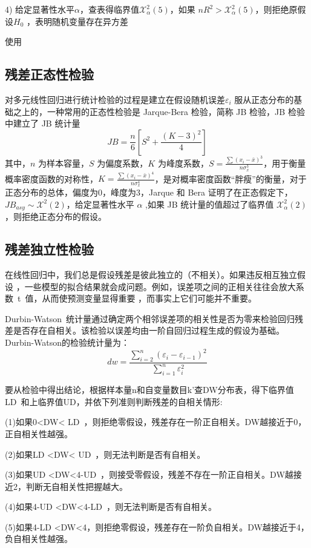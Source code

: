 \documentclass [a4paper]{article}
\begin{document}
4) 给定显著性水平$\alpha$，查表得临界值$\mathcal{X}_\alpha^2(5)$，如果 $nR^2>\mathcal{X}_\alpha^2(5)$，则拒绝原假设$H_0$ ，表明随机变量存在异方差

使用
\subsection{残差正态性检验}


对多元线性回归进行统计检验的过程是建立在假设随机误差$\varepsilon_i$ 服从正态分布的基础之上的，一种常用的正态性检验是 Jarque-Bera 检验，简称 JB 检验，JB 检验中建立了 JB 统计量
$$
JB = \frac{n}{6}[S^2 + \frac{(K-3)^2}{4}]
$$
其中，$n$ 为样本容量，$S$ 为偏度系数，$K$ 为峰度系数，$S = \frac{\sum(x_i -\bar{x})^3}{n\sigma_x^3}$，用于衡量概率密度函数的对称性，$K=\frac{\sum(x_i-\bar{x})^4}{n\sigma_x^4}$，是对概率密度函数“胖瘦”的衡量，对于正态分布的总体，偏度为0，峰度为3，Jarque 和 Bera 证明了在正态假定下，$JB_{asy} \sim \mathcal{X}^2(2)$，给定显著性水平 $\alpha$ ,如果 JB 统计量的值超过了临界值 $\mathcal{X}^2_\alpha(2)$，则拒绝正态分布的假设。


\subsection{残差独立性检验}

在线性回归中，我们总是假设残差是彼此独立的（不相关）。如果违反相互独立假设 ，一些模型的拟合结果就会成问题。例如，误差项之间的正相关往往会放大系数 t 值，从而使预测变量显得重要 ，而事实上它们可能并不重要。

Durbin-Watson 统计量通过确定两个相邻误差项的相关性是否为零来检验回归残差是否存在自相关。该检验以误差均由一阶自回归过程生成的假设为基础。Durbin-Watson的检验统计量为：
$$
dw= \frac{\sum_{i=2}^n(\varepsilon_i-\varepsilon_{i-1})^2}{\sum_{i=1}^n\varepsilon_i^2}
$$


要从检验中得出结论，根据样本量n和自变量数目k'查DW分布表，得下临界值LD 和上临界值UD，并依下列准则判断残差的自相关情形:

(1)如果0<DW< LD ，则拒绝零假设，残差存在一阶正自相关。DW越接近于0，正自相关性越强。

(2)如果LD <DW< UD ，则无法判断是否有自相关。

(3)如果UD <DW<4-UD ，则接受零假设，残差不存在一阶正自相关。DW越接近2，判断无自相关性把握越大。

(4)如果4-UD <DW<4-LD ，则无法判断是否有自相关。

(5)如果4-LD <DW<4，则拒绝零假设，残差存在一阶负自相关。DW越接近于4，负自相关性越强。
\end{document}
